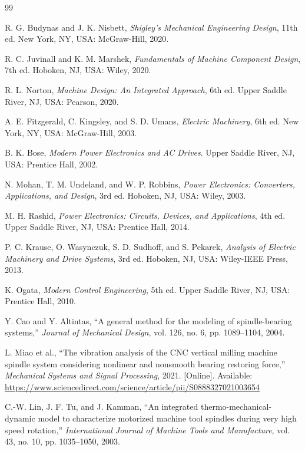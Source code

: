 \documentclass[12pt,a4paper]{report}
\begin{document}
		\begin{thebibliography}{99}
			
			 R. G. Budynas and J. K. Nisbett, \emph{Shigley's Mechanical Engineering Design}, 11th ed. New York, NY, USA: McGraw-Hill, 2020.
			
			 R. C. Juvinall and K. M. Marshek, \emph{Fundamentals of Machine Component Design}, 7th ed. Hoboken, NJ, USA: Wiley, 2020.
			
			 R. L. Norton, \emph{Machine Design: An Integrated Approach}, 6th ed. Upper Saddle River, NJ, USA: Pearson, 2020.
			
			 A. E. Fitzgerald, C. Kingsley, and S. D. Umans, \emph{Electric Machinery}, 6th ed. New York, NY, USA: McGraw-Hill, 2003.
			
			 B. K. Bose, \emph{Modern Power Electronics and AC Drives}. Upper Saddle River, NJ, USA: Prentice Hall, 2002.
			
			 N. Mohan, T. M. Undeland, and W. P. Robbins, \emph{Power Electronics: Converters, Applications, and Design}, 3rd ed. Hoboken, NJ, USA: Wiley, 2003.
			
			 M. H. Rashid, \emph{Power Electronics: Circuits, Devices, and Applications}, 4th ed. Upper Saddle River, NJ, USA: Prentice Hall, 2014.
			
			 P. C. Krause, O. Wasynczuk, S. D. Sudhoff, and S. Pekarek, \emph{Analysis of Electric Machinery and Drive Systems}, 3rd ed. Hoboken, NJ, USA: Wiley-IEEE Press, 2013.
			
			 K. Ogata, \emph{Modern Control Engineering}, 5th ed. Upper Saddle River, NJ, USA: Prentice Hall, 2010.
			
			 Y. Cao and Y. Altintas, ``A general method for the modeling of spindle-bearing systems,'' \emph{Journal of Mechanical Design}, vol. 126, no. 6, pp. 1089--1104, 2004.
			
			 L. Miao et al., ``The vibration analysis of the CNC vertical milling machine spindle system considering nonlinear and nonsmooth bearing restoring force,'' \emph{Mechanical Systems and Signal Processing}, 2021. [Online]. Available: \url{https://www.sciencedirect.com/science/article/pii/S0888327021003654}
			
			 C.-W. Lin, J. F. Tu, and J. Kamman, ``An integrated thermo-mechanical-dynamic model to characterize motorized machine tool spindles during very high speed rotation,'' \emph{International Journal of Machine Tools and Manufacture}, vol. 43, no. 10, pp. 1035--1050, 2003.
			

\end{thebibliography}
\end{document}
